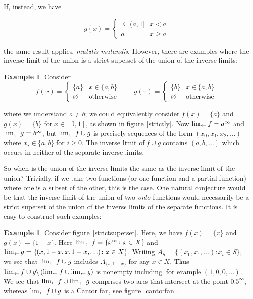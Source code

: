 \documentclass{article}
\theoremstyle{definition}
\newtheorem{exam}[thm]{Example}
\let\emptyset\varnothing
\begin{document}
If, instead, we have

\begin{equation}
  g(x) = \begin{cases}
    \subseteq(a,1] & x<a\\
 a & x\geqslant a
    \end{cases}
\end{equation}

the same result applies, {\em mutatis mutandis}.  However, there are
examples where the inverse limit of the union is a strict superset of 
the union of the inverse limits:

\begin{exam}
Consider
\begin{equation}
  f(x) = \begin{cases}
\lbrace a\rbrace & x\in\lbrace a,b\rbrace\\
\emptyset & \mbox{otherwise}
    \end{cases}\qquad
  g(x) = \begin{cases}
\lbrace b\rbrace & x\in\lbrace a,b\rbrace\\
\emptyset & \mbox{otherwise}
    \end{cases}
\end{equation}

  where we understand $a\neq b$; we could equivalently consider
  $f(x)=\lbrace a\rbrace$ and $g(x)=\lbrace b\rbrace$ for $x\in[0,1]$,
  as shown in figure~\ref{strictly}.  Now $\lim_{\leftarrow} f=a^\infty$ and
  $\lim_{\leftarrow} g=b^\infty$, but $\lim_{\leftarrow} f \cup g$ is precisely
  sequences of the form $(x_0,x_1,x_2,\ldots)$ where $x_i\in\lbrace
  a,b\rbrace$ for $i\geqslant 0$.  The inverse limit of $f\cup g$
  contains $(a,b,\ldots)$ which occurs in neither of the separate
  inverse limits.
\end{exam}

So when is the union of the inverse limits the same as the inverse
limit of the union?  Trivially, if we take two functions (or one
function and a partial function) where one is a subset of the other,
this is the case.  One natural conjecture would be that the inverse
limit of the union of two {\em onto} functions would necessarily be a
strict superset of the union of the inverse limits of the separate
functions.  It is easy to construct such examples:

\begin{exam}
Consider figure~\ref{strictsuperset}.  Here, we have $f(x)=\lbrace
x\rbrace$ and $g(x)=\lbrace 1-x\rbrace$.  Here $\lim_{\leftarrow} f=\lbrace
x^\infty\colon x\in X\rbrace$ and $\lim_{\leftarrow} g = \lbrace (x, 1-x, x,
1-x, \ldots)\colon x\in X\rbrace$.  Writing
$A_S=\lbrace(x_0,x_1,\ldots)\colon x_i\in S\rbrace$, we see that
$\lim_{\leftarrow} f\cup g$ includes $A_{\lbrace x,1-x\rbrace}$ for any $x\in
X$. Thus $\lim_{\leftarrow} f\cup
  g\backslash\left(\lim_{\leftarrow} f\cup\lim_{\leftarrow} g\right)$ is nonempty
including, for example $(1,0,0,\ldots)$.  We see that
$\lim_{\leftarrow} f\cup\lim_{\leftarrow} g$ comprises two arcs that intersect at the
point $0.5^\infty$, whereas $\lim_{\leftarrow} f \cup g$ is a Cantor fan, see
figure~\ref{cantorfan}.
\end{exam}
\end{document}
